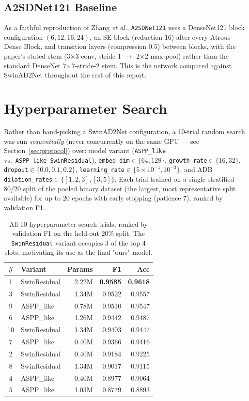 \documentclass[10pt,twocolumn]{article}
\newcommand{\code}[1]{\texttt{\small #1}}
\begin{document}
\subsection{A2SDNet121 Baseline}
\label{sec:a2sdnet}
As a faithful reproduction of Zhang \emph{et al.}, \code{A2SDNet121} uses a DenseNet121 block configuration $(6,12,16,24)$, an SE block (reduction 16) after every Atrous Dense Block, and transition layers (compression 0.5) between blocks, with the paper's stated stem (3$\times$3 conv, stride 1 $\to$ 2$\times$2 max-pool) rather than the standard DenseNet 7$\times$7-stride-2 stem. This is the network compared against SwinAD2Net throughout the rest of this report.

\section{Hyperparameter Search}
\label{sec:hpsearch}

Rather than hand-picking a SwinAD2Net configuration, a 10-trial random search was run \emph{sequentially} (never concurrently on the same GPU --- see Section~\ref{sec:protocol}) over: model variant (\code{ASPP\_like} vs.\ \code{ASPP\_like\_SwinResidual}), \code{embed\_dim}$\in\{64,128\}$, \code{growth\_rate}$\in\{16,32\}$, \code{dropout}$\in\{0.0,0.1,0.2\}$, \code{learning\_rate}$\in\{5{\times}10^{-4},10^{-3}\}$, and ADB \code{dilation\_rates}$\in\{[1,2,3],[3,5]\}$. Each trial trained on a single stratified 80/20 split of the pooled binary dataset (the largest, most representative split available) for up to 20 epochs with early stopping (patience 7), ranked by validation F1.

\begin{table}[H]
\centering\small
\begin{tabular}{@{}clrrr@{}}
\toprule
\# & Variant & Params & F1 & Acc \\
\midrule
1 & SwinResidual & 2.22M & \textbf{0.9585} & \textbf{0.9618} \\
3 & SwinResidual & 1.34M & 0.9522 & 0.9557 \\
9 & ASPP\_like & 0.78M & 0.9510 & 0.9547 \\
6 & ASPP\_like & 1.26M & 0.9442 & 0.9487 \\
10 & SwinResidual & 1.34M & 0.9403 & 0.9447 \\
7 & ASPP\_like & 0.40M & 0.9366 & 0.9416 \\
2 & SwinResidual & 0.40M & 0.9184 & 0.9225 \\
8 & SwinResidual & 1.34M & 0.9017 & 0.9115 \\
4 & ASPP\_like & 0.40M & 0.8977 & 0.9064 \\
5 & ASPP\_like & 1.03M & 0.8779 & 0.8893 \\
\bottomrule
\end{tabular}
\caption{All 10 hyperparameter-search trials, ranked by validation F1 on the held-out 20\% split. The \code{SwinResidual} variant occupies 3 of the top 4 slots, motivating its use as the final "ours" model.}
\label{tab:hpsearch}
\end{table}
\end{document}
